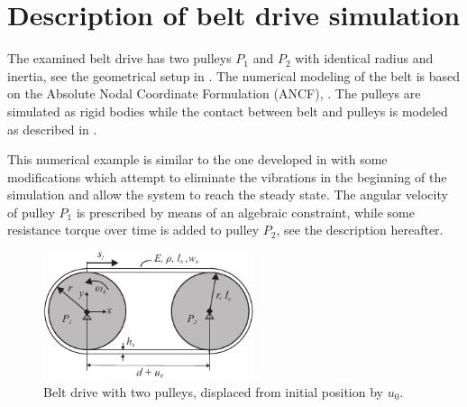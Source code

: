 \section{Description of belt drive simulation}
The examined belt drive has two pulleys $P_1$ and $P_2$ with identical radius and inertia, see the geometrical setup in .
%
The numerical modeling of the belt is based on the Absolute Nodal Coordinate Formulation (ANCF), \cite{Gerstmayr2008}. The pulleys are simulated as rigid bodies while the contact between belt and pulleys is modeled as described in \cite{Ntarladima2023}.


%
This numerical example is similar to the one developed in \cite{Pechstein2013} with some modifications which attempt to eliminate the vibrations in the beginning of the simulation and allow the system to reach the steady state. The angular velocity of pulley $P_1$ is prescribed by means of an algebraic constraint, while some resistance torque over time is added to pulley $P_2$, see the description hereafter.
\begin{figure}[tbph]
    \centering
    \includegraphics[width=0.55\textwidth]{figures/ESR8_beltPechstein.pdf}
    \caption{Belt drive with two pulleys, displaced from initial position by $u_0$.}
    \label{fig:ESR8_BeltDrive}
\end{figure}
